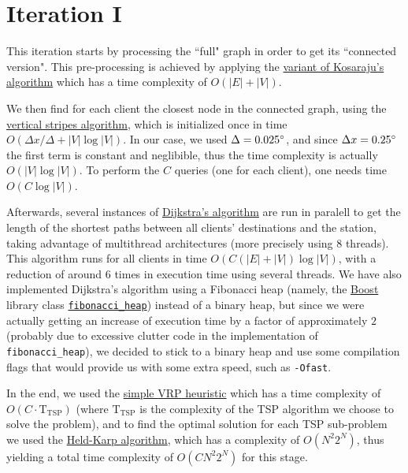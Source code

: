 \section{Iteration I}
This iteration starts by processing the ``full" graph in order to get its ``connected version". This pre-processing is achieved by applying the \hyperref[algorithm-scc-kosaraju-v]{variant of Kosaraju's algorithm} which has a time complexity of $O(|E| + |V|)$.\par
We then find for each client the closest node in the connected graph, using the \hyperref[algorithm-vstripes]{vertical stripes algorithm}, which is initialized once in time $O(\Delta x / \Delta + |V| \log |V|)$. In our case, we used $\Delta = 0.025\degree$, and since $\Delta x = 0.25\degree$ the first term is constant and neglibible, thus the time complexity is actually $O(|V| \log |V|)$. To perform the $C$ queries (one for each client), one needs time $O(C \log |V|)$.\par
Afterwards, several instances of \hyperref[algorithm-shortestpath-dijkstra]{Dijkstra's algorithm} are run in paralell to get the length of the shortest paths between all clients' destinations and the station, taking advantage of multithread architectures (more precisely using 8 threads). This algorithm runs for all clients in time $O(C(|E|+|V|) \log |V|)$, with a reduction of around 6 times in execution time using several threads. We have also implemented Dijkstra's algorithm using a Fibonacci heap (namely, the \href{https://www.boost.org/}{Boost} library class \href{https://www.boost.org/doc/libs/1_49_0/doc/html/boost/heap/fibonacci_heap.html}{\texttt{fibonacci\_heap}}) instead of a binary heap, but since we were actually getting an increase of execution time by a factor of approximately $2$ (probably due to excessive clutter code in the implementation of \texttt{fibonacci\_heap}), we decided to stick to a binary heap and use some compilation flags that would provide us with some extra speed, such as \texttt{-Ofast}.
\par
In the end, we used the \hyperref[algorithm-vrp-heuristic]{simple \acrshort*{VRP} heuristic} which has a time complexity of $O(C \cdot \text{T}_\text{TSP})$ (where $\text{T}_\text{TSP}$ is the complexity of the \acrshort{TSP} algorithm we choose to solve the problem), and to find the optimal solution for each \acrshort{TSP} sub-problem we used the \hyperref[algorithm-tsp-heldkarp]{Held-Karp algorithm}, which has a complexity of $O(N^2 2^N)$, thus yielding a total time complexity of $O(C N^2 2^N)$ for this stage.\par

